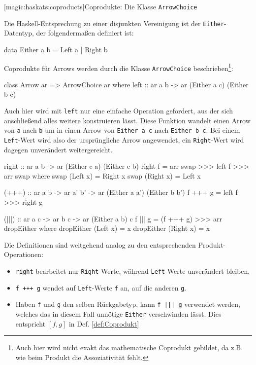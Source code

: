 \documentclass[a4paper, bibgerm]{article}
\newcommand\icode[1]{\lstinline?#1?}
\newcommand\lsubsubsection{}
\newcommand{\dref}[1]{Def. \ref{def:#1}}
\begin{document}
\lsubsubsection[magic:haskats:coproducts]{Coprodukte: Die Klasse \icode{ArrowChoice}}

Die Haskell-Entsprechung zu einer disjunkten Vereinigung ist der
\icode{Either}-Datentyp, der folgendermaßen definiert ist:
\begin{code}
data Either a b = Left a | Right b
\end{code}
Coprodukte für Arrows werden durch die Klasse \icode{ArrowChoice} beschrieben\footnote{Auch hier
  wird nicht exakt das mathematische Coprodukt gebildet, da z.B. wie
  beim Produkt die Assoziativität fehlt.}:
\begin{code}
class Arrow ar => ArrowChoice ar where
  left :: ar a b -> ar (Either a c) (Either b c)
\end{code}
Auch hier wird mit \icode{left} nur eine einfache Operation gefordert,
aus der sich anschließend alles weitere konstruieren lässt. Diese
Funktion wandelt einen Arrow von \icode{a} nach \icode{b} um in
einen Arrow von \icode{Either a c} nach \icode{Either b c}. Bei einem
\icode{Left}-Wert wird also der ursprüngliche Arrow angewendet, ein
\icode{Right}-Wert wird dagegen unverändert weitergereicht.
\begin{code}
  right :: ar a b -> ar (Either c a) (Either c b)
  right f = arr swap >>> left f >>> arr swap
    where swap (Left x)  = Right x
          swap (Right x) = Left x

  (+++) :: ar a b -> ar a' b' -> ar (Either a a') (Either b b')
  f +++ g = left f >>> right g

  (|||) :: ar a c -> ar b c -> ar (Either a b) c  
  f ||| g = (f +++ g) >>> arr dropEither
    where dropEither (Left x)  = x
          dropEither (Right x) = x

\end{code}
Die Definitionen sind weitgehend analog zu den entsprechenden
Produkt-Operationen:
\begin{itemize}
\item \icode{right} bearbeitet nur \icode{Right}-Werte, während
  \icode{Left}-Werte unverändert bleiben.
\item \icode{f +++ g} wendet auf \icode{Left}-Werte \icode{f} an, auf
  die anderen \icode{g}.
\item Haben \icode{f} und \icode{g} den selben Rückgabetyp, kann
  \icode{f ||| g} verwendet werden, welches das in diesem Fall unnötige
  \icode{Either} verschwinden lässt. Dies entspricht $[f,g]$ in
  \dref{Coprodukt}
\end{itemize}
\end{document}
